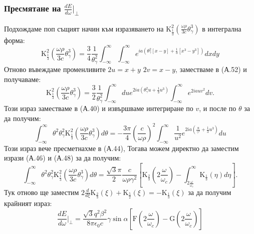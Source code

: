 \begin{appendices}
\subsubsection{Пресмятане на $\frac{dE}{d\omega}\big\vert_\perp$}
Подхождаме поп същият начин към изразяването на  $\text{K}^2_{\frac{1}{3}}\left(\frac{\omega\rho}{3 c}\theta_\gamma^3\right)$ в интегрална форма:
\begin{equation}
	\text{K}^2_{\frac{1}{3}}\left(\frac{\omega\rho}{3 c}\theta_\gamma^3\right) = 	\frac{3}{4}\frac{1}{\theta_\gamma^2}\int_{-\infty}^\infty \int_{-\infty}^\infty e^{ia\left(\theta_\gamma^2[x - y] + \frac{1}{3}[x^3 - y^3]\right)}dxdy
\end{equation}
Отново въвеждаме променливите $2u = x + y$ $2v = x - y$, заместваме в (А.52) и получаваме:
\begin{equation}
	\text{K}^2_{\frac{1}{3}}\left(\frac{\omega\rho}{3 c}\theta_\gamma^3\right) = 	\frac{3}{2}\frac{1}{\theta_\gamma^2}\int_{-\infty}^\infty du e^{2ia\left(\theta_\gamma^2 u + \frac{1}{3}u^3\right)}\int_{-\infty}^{\infty}e^{2iauv^2}dv.
\end{equation}
Този израз заместваме в (А.40) и извършваме интегриране по $v$, и после по $\theta$ за да получим:
\begin{equation}
	\int_{-\infty}^\infty \theta^2\theta_\gamma^2 \text{K}^2_{\frac{1}{3}}\left(\frac{\omega\rho}{3 c}\theta_\gamma^3\right)d\theta = -\frac{3\pi}{4}\left(\frac{c}{\omega\rho}\right)^2\int_{-\infty}^{\infty}\frac{1}{u^2} e^{2ia\left(\frac{u}{\gamma^2}+\frac{1}{3}u^3\right)}du
\end{equation}
Този израз вече пресметнахме в (А.44), Тогава можем директно да заместим изрази (А.46) и (А.48) за да получим:
\begin{equation}
	\int_{-\infty}^\infty \theta^2\theta_\gamma^2 \text{K}^2_{\frac{1}{3}}\left(\frac{\omega\rho}{3 c}\theta_\gamma^3\right)d\theta = \frac{\sqrt{3}\pi}{2}\frac{c}{\omega\rho \gamma^2}\left[\text{K}_{\frac{2}{3}}\left(2\frac{\omega}{\omega_c}\right) - \int_{2\frac{\omega}{\omega_c}}^\infty \text{K}_{\frac{1}{3}}(\eta)d\eta\right].
\end{equation}
Тук отново ще заместим $2\frac{d}{d\xi}\text{K}_{\frac{2}{3}}(\xi) + \text{K}_{\frac{5}{2}}(\xi) = - \text{K}_{\frac{1}{3}}(\xi)$ за да получим крайният израз:
\begin{equation}
	\boxed{\frac{dE}{d\omega}\bigg\vert_\perp = \frac{\sqrt{3}q^2\beta^2}{8\pi\epsilon_0 c}\gamma\sin\alpha\left[\text{F}\left(2\frac{\omega}{\omega_c}\right) - \text{G}\left(2\frac{\omega}{\omega_c}\right)\right]}
\end{equation}

\end{appendices}

